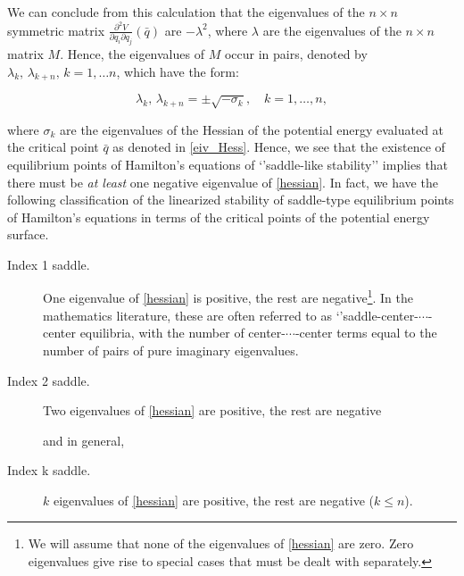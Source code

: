 \documentclass{article}
\begin{document}
 \noindent
 We can conclude from this calculation that the eigenvalues of the $n \times n$ symmetric matrix $\frac{\partial^2 V}{\partial q_i \partial q_j} (\bar{q})$ are $-\lambda^2$, where $\lambda$ are the eigenvalues of  the $n \times n$ matrix $M$. Hence, the eigenvalues of $M$ occur in pairs,  denoted by
 $\lambda_k, \, \lambda_{k+n}, \, k=1, \ldots n$, which have the form:
 


\begin{equation}
\lambda_k, \, \lambda_{k+n} = \pm \sqrt{-\sigma_k},  \quad k=1, \ldots, n,
\end{equation}



\noindent
where $\sigma_k$ are the eigenvalues of the Hessian of the potential energy evaluated at the critical point $\bar{q}$ as denoted in \eqref{eiv_Hess}.  Hence,
we see that  the existence of equilibrium points of Hamilton's equations of `'saddle-like stability''  implies that there must be {\em at least} one negative eigenvalue of \eqref{hessian}. In fact, we have the following classification of the linearized stability of saddle-type equilibrium points of Hamilton's equations in terms of  the  critical points of the  potential energy surface.

\begin{description}

\item[Index 1 saddle.] One eigenvalue of \eqref{hessian} is positive, the rest are  negative\footnote{We will assume that none of the eigenvalues of \eqref{hessian} are zero. Zero eigenvalues  give rise to special cases that must be dealt with separately.}.
In the mathematics literature, these are often referred to as `'saddle-center-$\cdots$-center equilibria, with the number of center-$\cdots$-center terms equal to the number of pairs of pure imaginary eigenvalues.

\item[Index 2 saddle.] Two eigenvalues of \eqref{hessian} are positive, the rest are  negative

\medskip
\noindent
and in general,
\medskip

\item[Index k saddle.] $k$ eigenvalues of \eqref{hessian} are positive, the rest are  negative ($k \le n$).

\end{description}
\end{document}
